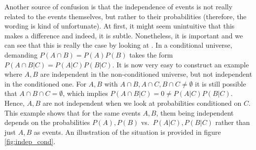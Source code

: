 Another source of confusion is that the independence of events is not really related to the events themselves, but rather to their probabilities (therefore, the wording is kind of unfortunate). At first, it might seem unintuitive that this makes a difference and indeed, it is subtle. Nonetheless, it is important and we can see that this is really the case by looking at . In a conditional universe, demanding $P(A \cap B) = P(A) P(B)$ takes the form $P(A \cap B | C) = P(A | C) P(B | C)$. It is now very easy to construct an example where $A, B$ are independent in the non-conditioned universe, but not independent in the conditioned one. For $A, B$ with $A \cap B, A \cap C, B \cap C \neq \emptyset$ it is still possible that $A \cap B \cap C = \emptyset$, which implies $P(A \cap B | C) = 0 \neq P(A | C) P(B | C)$. Hence, $A, B$ are not independent when we look at probabilities conditioned on $C$. This example shows that for the same events $A, B$, them being independent depends on the probabilities $P(A), P(B)$ vs.~$P(A | C), P(B | C)$ rather than just $A, B$ as events. An illustration of the situation is provided in figure \ref{fig:indep_cond}.




